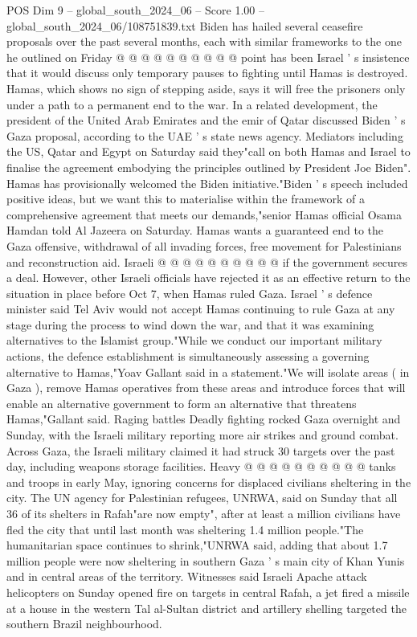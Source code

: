 \begin{textsample}{POS Dim 9 – global\_south\_2024\_06 – Score 1.00 – global\_south\_2024\_06/108751839.txt}
Biden has hailed several ceasefire proposals over the past several months, each with similar frameworks to the one he outlined on Friday @ @ @ @ @ @ @ @ @ @ point has been Israel ' s insistence that it would discuss only temporary pauses to fighting until Hamas is destroyed.
Hamas, which shows no sign of stepping aside, says it will free the prisoners only under a path to a permanent end to the war.
In a related development, the president of the United Arab Emirates and the emir of Qatar discussed Biden ' s Gaza proposal, according to the UAE ' s state news agency.
Mediators including the US, Qatar and Egypt on Saturday said they"call on both Hamas and Israel to finalise the agreement embodying the principles outlined by President Joe Biden".
Hamas has provisionally welcomed the Biden initiative."Biden ' s speech included positive ideas, but we want this to materialise within the framework of a comprehensive agreement that meets our demands,"senior Hamas official Osama Hamdan told Al Jazeera on Saturday.
Hamas wants a guaranteed end to the Gaza offensive, withdrawal of all invading forces, free movement for Palestinians and reconstruction aid.
Israeli @ @ @ @ @ @ @ @ @ @ if the government secures a deal.
However, other Israeli officials have rejected it as an effective return to the situation in place before Oct 7, when Hamas ruled Gaza.
Israel ' s defence minister said Tel Aviv would not accept Hamas continuing to rule Gaza at any stage during the process to wind down the war, and that it was examining alternatives to the Islamist group."While we conduct our important military actions, the defence establishment is simultaneously assessing a governing alternative to Hamas,"Yoav Gallant said in a statement."We will isolate areas ( in Gaza ), remove Hamas operatives from these areas and introduce forces that will enable an alternative government to form an alternative that threatens Hamas,"Gallant said.
Raging battles Deadly fighting rocked Gaza overnight and Sunday, with the Israeli military reporting more air strikes and ground combat.
Across Gaza, the Israeli military claimed it had struck 30 targets over the past day, including weapons storage facilities.
Heavy @ @ @ @ @ @ @ @ @ @ tanks and troops in early May, ignoring concerns for displaced civilians sheltering in the city.
The UN agency for Palestinian refugees, UNRWA, said on Sunday that all 36 of its shelters in Rafah"are now empty", after at least a million civilians have fled the city that until last month was sheltering 1.4 million people."The humanitarian space continues to shrink,"UNRWA said, adding that about 1.7 million people were now sheltering in southern Gaza ' s main city of Khan Yunis and in central areas of the territory.
Witnesses said Israeli Apache attack helicopters on Sunday opened fire on targets in central Rafah, a jet fired a missile at a house in the western Tal al-Sultan district and artillery shelling targeted the southern Brazil neighbourhood.

\end{textsample}
